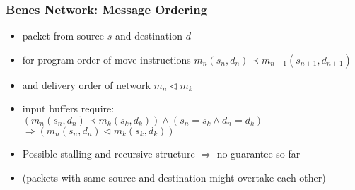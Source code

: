 \begin{frame}
	\frametitle{Benes Network: Message Ordering}
	\begin{itemize}
		\item packet from source $s$ and destination $d$
		\item for program order of move instructions $m_n(s_n, d_n) \prec m_{n+1}(s_{n+1}, d_{n+1})$
		\item and delivery order of network $m_n \lhd m_k$
		\item input buffers require: \\
		      $(m_n(s_n, d_n) \prec m_k(s_k, d_k)) \wedge (s_n = s_k \wedge d_n = d_k)$ \\
		      $\Rightarrow (m_n(s_n, d_n) \lhd m_k(s_k, d_k))$
		
		\item Possible stalling and recursive structure $\Rightarrow$ no guarantee so far
		\item (packets with same source and destination might overtake each other)
	\end{itemize}
\end{frame}
	
